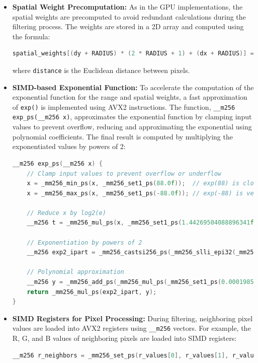\documentclass[12pt,a4paper]{report}
\begin{document}
\begin{itemize}
\item \textbf{Spatial Weight Precomputation:} As in the GPU implementations, the spatial weights are precomputed to avoid redundant calculations during the filtering process. The weights are stored in a 2D array and computed using the formula:
\begin{lstlisting}[language=c++]
spatial_weights[(dy + RADIUS) * (2 * RADIUS + 1) + (dx + RADIUS)] = exp(-(distance * distance) / (2 * SIGMA_D * SIGMA_D));
\end{lstlisting}
where \texttt{distance} is the Euclidean distance between pixels.

\item \textbf{SIMD-based Exponential Function:} To accelerate the computation of the exponential function for the range and spatial weights, a fast approximation of \texttt{exp()} is implemented using AVX2 instructions. The function, \texttt{\_\_m256 exp\_ps(\_\_m256 x)}, approximates the exponential function by clamping input values to prevent overflow, reducing and approximating the exponential using polynomial coefficients. The final result is computed by multiplying the exponentiated values by powers of 2:
\begin{lstlisting}[language=c++]
__m256 exp_ps(__m256 x) {
    // Clamp input values to prevent overflow or underflow
    x = _mm256_min_ps(x, _mm256_set1_ps(88.0f));  // exp(88) is close to FLT_MAX
    x = _mm256_max_ps(x, _mm256_set1_ps(-88.0f)); // exp(-88) is very close to 0

    // Reduce x by log2(e)
    __m256 t = _mm256_mul_ps(x, _mm256_set1_ps(1.44269504088896341f)); // x * log2(e)

    // Exponentiation by powers of 2
    __m256 exp2_ipart = _mm256_castsi256_ps(_mm256_slli_epi32(_mm256_add_epi32(_mm256_cvtps_epi32(t), _mm256_set1_epi32(127)), 23));

    // Polynomial approximation
    __m256 y = _mm256_add_ps(_mm256_mul_ps(_mm256_set1_ps(0.0001985f), t), _mm256_set1_ps(1.0f));
    return _mm256_mul_ps(exp2_ipart, y);
}
\end{lstlisting}

\item \textbf{SIMD Registers for Pixel Processing:} During filtering, neighboring pixel values are loaded into AVX2 registers using \texttt{\_\_m256} vectors. For example, the R, G, and B values of neighboring pixels are loaded into SIMD registers:
\begin{lstlisting}[language=c++]
__m256 r_neighbors = _mm256_set_ps(r_values[0], r_values[1], r_values[2], r_values[3], r_values[5], r_values[6], r_values[7], r_values[8]);
\end{lstlisting}


\end{itemize}
\end{document}
